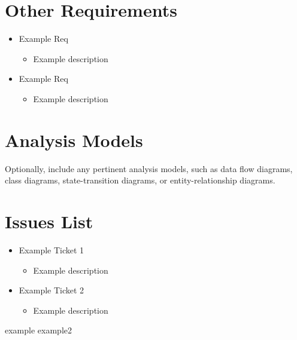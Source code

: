 \documentclass[12pt,oneside,letterpaper]{article}
\begin{document}
\section{Other Requirements}
\begin{itemize}
    \item Example Req
    \begin{itemize}
        \item Example description
    \end{itemize}
    \item Example Req
    \begin{itemize}
        \item Example description
    \end{itemize}
\end{itemize}

\appendix

\section{Analysis Models}
Optionally, include any pertinent analysis models, such as data flow diagrams, class diagrams, state-transition diagrams, or entity-relationship diagrams.

\section{Issues List}
\begin{itemize}
    \item Example Ticket 1
    \begin{itemize}
        \item Example description
    \end{itemize}
    \item Example Ticket 2
    \begin{itemize}
        \item Example description
    \end{itemize}
\end{itemize}


\gls{example} \gls{example2}

\printnoidxglossary[sort=standard]
\end{document}
